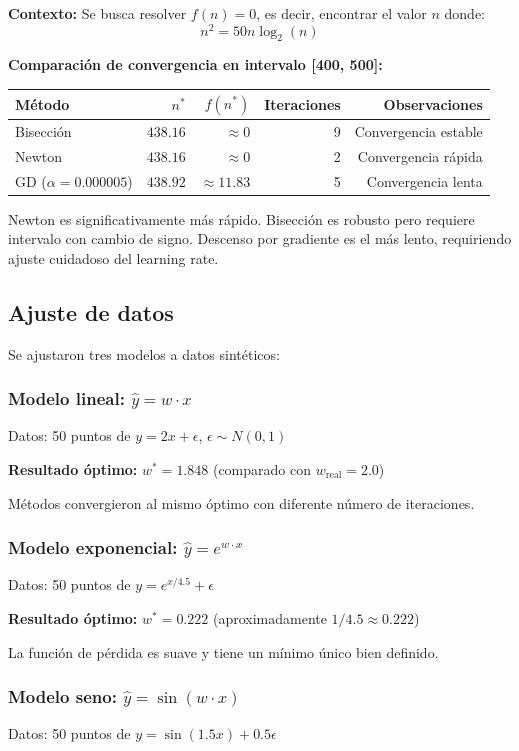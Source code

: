 \documentclass[12pt,a4paper]{article}
\begin{document}
\textbf{Contexto:} Se busca resolver $f(n)=0$, es decir, encontrar el valor $n$ donde:
$$n^2 = 50n\log_2(n)$$

\textbf{Comparación de convergencia en intervalo [400, 500]:}
\begin{center}
\begin{tabular}{lrrrr}
\toprule
Método & $n^*$ & $f(n^*)$ & Iteraciones & Observaciones \\
\midrule
Bisección & $438.16$ & $\approx 0$ & 9 & Convergencia estable \\
Newton & $438.16$ & $\approx 0$ & 2 & Convergencia rápida \\
GD ($\alpha=0.000005$) & $438.92$ & $\approx 11.83$ & 5 & Convergencia lenta \\
\bottomrule
\end{tabular}
\end{center}

Newton es significativamente más rápido. Bisección es robusto pero requiere intervalo con cambio de signo. Descenso por gradiente es el más lento, requiriendo ajuste cuidadoso del learning rate.

\subsection{Ajuste de datos}
Se ajustaron tres modelos a datos sintéticos:

\subsubsection{Modelo lineal: $\hat{y}=w \cdot x$}
Datos: 50 puntos de $y = 2x + \epsilon$, $\epsilon \sim N(0, 1)$

\textbf{Resultado óptimo:} $w^* = 1.848$ (comparado con $w_{\text{real}} = 2.0$)

Métodos convergieron al mismo óptimo con diferente número de iteraciones.

\subsubsection{Modelo exponencial: $\hat{y}=e^{w \cdot x}$}
Datos: 50 puntos de $y = e^{x/4.5} + \epsilon$

\textbf{Resultado óptimo:} $w^* = 0.222$ (aproximadamente $1/4.5 \approx 0.222$)

La función de pérdida es suave y tiene un mínimo único bien definido.

\subsubsection{Modelo seno: $\hat{y}=\sin(w \cdot x)$}
Datos: 50 puntos de $y = \sin(1.5x) + 0.5\epsilon$
\end{document}
